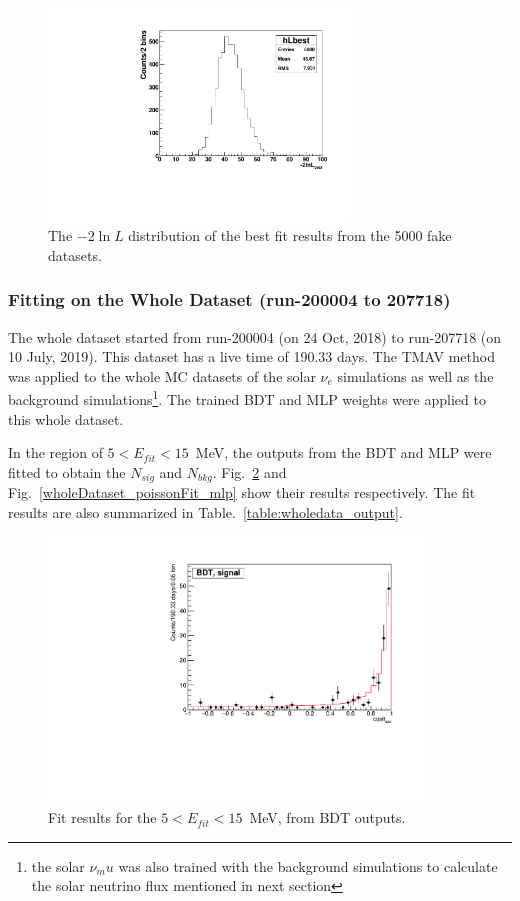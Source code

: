 \begin{figure}[!htb]
	\centering
	\includegraphics[width=8cm]{ensemble_lnLbest.pdf}
	\caption{The $-2\ln L$ distribution of the best fit results from the 5000 fake datasets.}
	\label{poisson_fitLnL}
\end{figure}

\subsubsection{Fitting on the Whole Dataset (run-200004 to 207718)}\label{sect:fitTheWhole}
The whole dataset started from run-200004 (on 24 Oct, 2018) to run-207718 (on 10 July, 2019). This dataset has a live time of 190.33 days. The TMAV method was applied to the whole MC datasets of the solar $\nu_e$ simulations as well as the background simulations\footnote{the solar $\nu_mu$ was also trained with the background simulations to calculate the solar neutrino flux mentioned in next section}. The trained BDT and MLP weights were applied to this whole dataset.

In the region of $5<E_{fit}<15$~MeV, the outputs from the BDT and MLP were fitted to obtain the $N_{sig}$ and $N_{bkg}$. Fig.~\ref{wholeDataset_poissonFit_bdt} and Fig.~\ref{wholeDataset_poissonFit_mlp} show their results respectively. The fit results are also summarized in Table.~\ref{table:wholedata_output}.

\begin{figure}[!htb]
	\centering
	\includegraphics[width=10cm]{wholedataFit_bdt.pdf}
	\caption{Fit results for the $5<E_{fit}<15$~MeV, from BDT outputs.} \label{wholeDataset_poissonFit_bdt}
\end{figure} 

